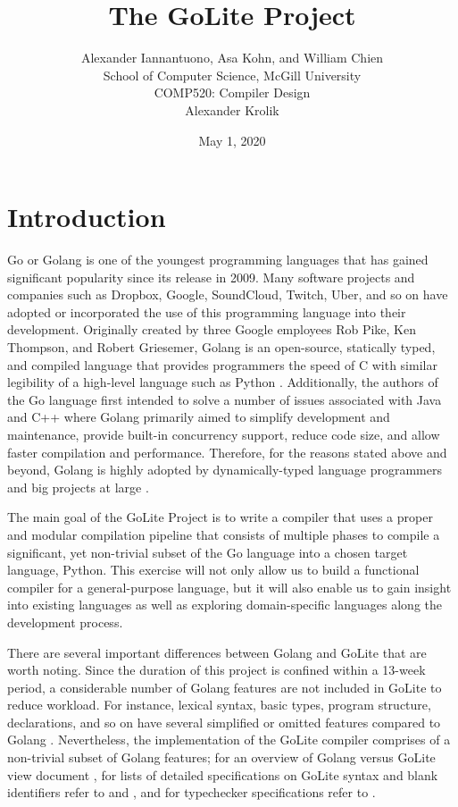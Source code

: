 \documentclass{article}
\title{The GoLite Project}
\author{Alexander Iannantuono, Asa Kohn, and William Chien\\
School of Computer Science, McGill University\\
COMP520: Compiler Design\\
Alexander Krolik}
\date{May 1, 2020}
\begin{document}
\maketitle

\section{Introduction}
Go or Golang is one of the youngest programming languages that has gained significant popularity since its release in 2009. Many software projects and companies such as Dropbox, Google, SoundCloud, Twitch, Uber, and so on have adopted or incorporated the use of this programming language into their development. Originally created by three Google employees Rob Pike, Ken Thompson, and Robert Griesemer, Golang is an open-source, statically typed, and compiled language that provides programmers the speed of C with similar legibility of a high-level language such as Python \citep{gospec, MattCompanies, VincentGoLite}. Additionally, the authors of the Go language first intended to solve a number of issues associated with Java and C++ where Golang primarily aimed to simplify development and maintenance, provide built-in concurrency support, reduce code size, and allow faster compilation and performance. Therefore, for the reasons stated above and beyond, Golang is highly adopted by dynamically-typed language programmers and big projects at large \citep{MattCompanies, VincentGoLite}.

The main goal of the GoLite Project is to write a compiler that uses a proper and modular compilation pipeline that consists of multiple phases to compile a significant, yet non-trivial subset of the Go language into a chosen target language, Python. This exercise will not only allow us to build a functional compiler for a general-purpose language, but it will also enable us to gain insight into existing languages as well as exploring domain-specific languages along the development process. 

There are several important differences between Golang and GoLite that are worth noting. Since the duration of this project is confined within a 13-week period, a considerable number of Golang features are not included in GoLite to reduce workload. For instance, lexical syntax, basic types, program structure, declarations, and so on have several simplified or omitted features compared to Golang \citep{VincentGoLite, AlexBlankSpecs, VincentSyntaxSpecs, VincentTypecheckSpecs}. Nevertheless, the implementation of the GoLite compiler comprises of a non-trivial subset of Golang features; for an overview of Golang versus GoLite view document \cite{VincentGoLite}, for lists of detailed specifications on GoLite syntax and blank identifiers refer to \cite{VincentSyntaxSpecs} and \cite{AlexBlankSpecs}, and for typechecker specifications refer to \cite{VincentTypecheckSpecs}.
\end{document}
